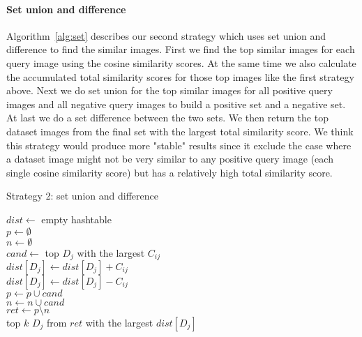 \paragraph{Set union and difference}
Algorithm~\ref{alg:set} describes our second strategy which uses set union and difference
to find the similar images. First we find the top similar images for each query image
using the cosine similarity scores. At the same time we also calculate the accumulated
total similarity scores for those top images like the first strategy above.
Next we do set union for the top similar images for
all positive query images and all negative query images to build a positive set and a negative
set. At last we do a set difference between the two sets. We then return the top
dataset images from the final set with the largest total similarity score. We think this
strategy would produce more "stable" results since it exclude the case where a dataset image
might not be very similar to any positive query image (each single cosine similarity score) but
has a relatively high total similarity score.

\begin{algorithm}[t]
\small
    \caption{Strategy 2: set union and difference}
    $dist \leftarrow$ empty hashtable \\
    $p \leftarrow \emptyset$ \\
    $n \leftarrow \emptyset$ \\
     {
        $cand \leftarrow$ top $D_j$ with the largest $C_{ij}$ \\
         {
             {
                $dist[D_j] \leftarrow dist[D_j] + C_{ij}$ \\
            } {
                $dist[D_j] \leftarrow dist[D_j] - C_{ij}$ \\
            }
        }
         {
            $p \leftarrow p \cup cand$ \\
        } {
            $n \leftarrow n \cup cand$ \\
        }   
    }
    $ret \leftarrow p \setminus n$ \\
    \Return top $k$ $D_j$ from $ret$ with the largest $dist[D_j]$
    \label{alg:set}
\end{algorithm}


